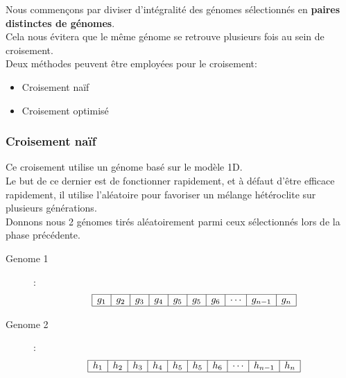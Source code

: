             Nous commençons par diviser d'intégralité des génomes sélectionnés en \textbf{paires distinctes de génomes}.\\
            Cela nous évitera que le même génome se retrouve plusieurs fois au sein de croisement.\\

            Deux méthodes peuvent être employées pour le croisement:
            \begin{itemize}
                \item Croisement naïf
                \item Croisement optimisé
            \end{itemize}
            \subsubsection{Croisement naïf}
                Ce croisement utilise un génome basé sur le modèle 1D.\\
                Le but de ce dernier est de fonctionner rapidement, et à défaut d'être efficace rapidement, il utilise l'aléatoire pour favoriser un mélange hétéroclite sur plusieurs générations.\\
                    Donnons nous 2 génomes tirés aléatoirement parmi ceux sélectionnés lors de la phase précédente.\\
                    \begin{description}
                        \item[Genome 1]:\\
                            \[
                                \begin{array}{|c|c|c|c|c|c|c|c|c|c|}
                                    \hline
                                    g_1&g_2&g_3&g_4&g_5&g_5&g_6&\cdots&g_{n-1}&g_{n}\\
                                    \hline
                                \end{array}
                            \]
                        \item[Genome 2]:\\
                            \[
                                \begin{array}{|c|c|c|c|c|c|c|c|c|c|}
                                    \hline
                                    h_1&h_2&h_3&h_4&h_5&h_5&h_6&\cdots&h_{n-1}&h_{n}\\
                                    \hline
                                \end{array}
                            \]
                    \end{description}

